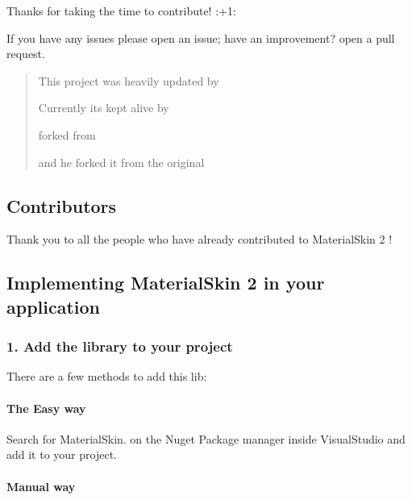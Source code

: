 Thanks for taking the time to contribute! \+:+1\+:

If you have any issues please open an issue; have an improvement? open a pull request.

\begin{quote}

\begin{DoxyItemize}
\item This project was heavily updated by \href{https://github.com/leocb/MaterialSkin}{\tt }
\item Currently it\textquotesingle{}s kept alive by \href{https://github.com/orapps44/MaterialSkin}{\tt }
\item forked from \href{https://github.com/donaldsteele/MaterialSkin}{\tt }
\item and he forked it from the original \href{https://github.com/IgnaceMaes/MaterialSkin}{\tt } 
\end{DoxyItemize}\end{quote}


\subsection*{Contributors}

Thank you to all the people who have already contributed to Material\+Skin 2 !

\href{https://github.com/leocb/MaterialSkin/graphs/contributors}{\tt }





\subsection*{Implementing Material\+Skin 2 in your application}

\subsubsection*{1. Add the library to your project}

There are a few methods to add this lib\+:

\paragraph*{The Easy way}

Search for Material\+Skin. on the Nuget Package manager inside Visual\+Studio and add it to your project.

\paragraph*{Manual way}

